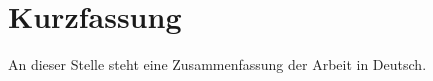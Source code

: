 \chapter{Kurzfassung}

\begin{german}
An dieser Stelle steht eine Zusammenfassung der Arbeit in Deutsch.
\end{german}